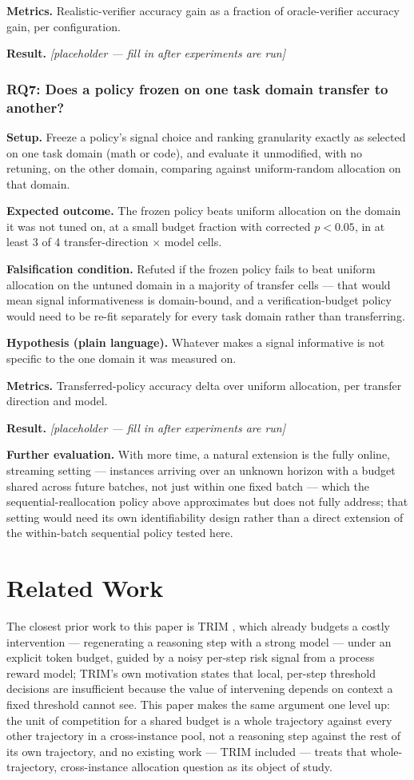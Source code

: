 \documentclass[11pt]{article}
\newcommand{\ph}{\textit{[placeholder --- fill in after experiments are run]}}
\begin{document}
\textbf{Metrics.} Realistic-verifier accuracy gain as a fraction of oracle-verifier accuracy gain, per configuration.

\textbf{Result.} \ph

\subsubsection{RQ7: Does a policy frozen on one task domain transfer to another?}
\textbf{Setup.} Freeze a policy's signal choice and ranking granularity exactly as selected on one task domain (math or code), and evaluate it unmodified, with no retuning, on the other domain, comparing against uniform-random allocation on that domain.

\textbf{Expected outcome.} The frozen policy beats uniform allocation on the domain it was not tuned on, at a small budget fraction with corrected $p < 0.05$, in at least 3 of 4 transfer-direction $\times$ model cells.

\textbf{Falsification condition.} Refuted if the frozen policy fails to beat uniform allocation on the untuned domain in a majority of transfer cells --- that would mean signal informativeness is domain-bound, and a verification-budget policy would need to be re-fit separately for every task domain rather than transferring.

\textbf{Hypothesis (plain language).} Whatever makes a signal informative is not specific to the one domain it was measured on.

\textbf{Metrics.} Transferred-policy accuracy delta over uniform allocation, per transfer direction and model.

\textbf{Result.} \ph

\vspace{0.5em}
\noindent\textbf{Further evaluation.} With more time, a natural extension is the fully online, streaming setting --- instances arriving over an unknown horizon with a budget shared across future batches, not just within one fixed batch --- which the sequential-reallocation policy above approximates but does not fully address; that setting would need its own identifiability design rather than a direct extension of the within-batch sequential policy tested here.

\section{Related Work}

The closest prior work to this paper is TRIM \citep{TRIM2607}, which already budgets a costly intervention --- regenerating a reasoning step with a strong model --- under an explicit token budget, guided by a noisy per-step risk signal from a process reward model; TRIM's own motivation states that local, per-step threshold decisions are insufficient because the value of intervening depends on context a fixed threshold cannot see. This paper makes the same argument one level up: the unit of competition for a shared budget is a whole trajectory against every other trajectory in a cross-instance pool, not a reasoning step against the rest of its own trajectory, and no existing work --- TRIM included --- treats that whole-trajectory, cross-instance allocation question as its object of study.
\end{document}
